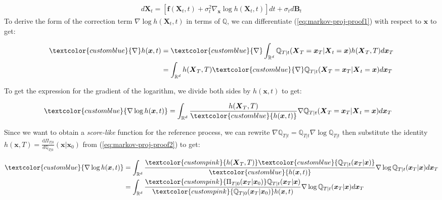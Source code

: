 \documentclass{article}
\newcommand{\bluetext}[1]{\textcolor{customblue}{#1}}
\newcommand{\pinktext}[1]{\textcolor{custompink}{#1}}
\begin{document}
\begin{align}
    d\boldsymbol{X}_t=\left[\boldsymbol{f}(\boldsymbol{X}_t,t)+\sigma_t^2\nabla _{\boldsymbol{x}}\log h(\boldsymbol{X}_t,t)\right]dt +\sigma_td\boldsymbol{B}_t\label{eq:markov-eq-4}
\end{align}
To derive the form of the correction term $\nabla \log h(\boldsymbol{X}_t,t)$ in terms of $\mathbb{Q}$, we can differentiate (\ref{eq:markov-proj-proof1}) with respect to $\boldsymbol{x}$ to get:
\begin{small}
\begin{align}
    \bluetext{\nabla }h(\boldsymbol{x},t)&=\bluetext{\nabla }\int_{\mathbb{R}^d}\mathbb{Q}_{T|t}(\boldsymbol{X}_T=\boldsymbol{x}_T|\boldsymbol{X}_t=\boldsymbol{x})h(\boldsymbol{X}_T,T)d\boldsymbol{x}_T\nonumber\\
    &=\int_{\mathbb{R}^d}h(\boldsymbol{X}_T,T)\bluetext{\nabla }\mathbb{Q}_{T|t}(\boldsymbol{X}_T=\boldsymbol{x}_T|\boldsymbol{X}_t=\boldsymbol{x})d\boldsymbol{x}_T
\end{align}
\end{small}
To get the expression for the gradient of the logarithm, we divide both sides by $h(\boldsymbol{x},t)$ to get:
\begin{small}
\begin{align}
    \bluetext{\nabla \log h(\boldsymbol{x},t)}&=\int_{\mathbb{R}^d}\frac{h(\boldsymbol{X}_T,T)}{\bluetext{h(\boldsymbol{x},t)}}\nabla \mathbb{Q}_{T|t}(\boldsymbol{X}_T=\boldsymbol{x}_T|\boldsymbol{X}_t=\boldsymbol{x})d\boldsymbol{x}_T
\end{align}
\end{small}
Since we want to obtain a \textit{score-like} function for the reference process, we can rewrite $\nabla \mathbb{Q}_{T|t}=\mathbb{Q}_{T|t}\nabla \log \mathbb{Q}_{T|t}$ then substitute the identity $h(\boldsymbol{x},T)=\frac{\mathrm{d} \Pi_{T|0}}{d \mathbb{Q}_{T|0}}(\boldsymbol{x}|\boldsymbol{x}_0)$ from (\ref{eq:markov-proj-proof2}) to get:
\begin{small}
\begin{align}
    \bluetext{\nabla \log h(\boldsymbol{x},t)}&=\int_{\mathbb{R}^d}\frac{\pinktext{h(\boldsymbol{X}_T,T)}\bluetext{\mathbb{Q}_{T|t}(\boldsymbol{x}_T|\boldsymbol{x})}}{\bluetext{h(\boldsymbol{x},t)}}\nabla \log\mathbb{Q}_{T|t}(\boldsymbol{x}_T|\boldsymbol{x})d\boldsymbol{x}_T\nonumber\\
    &=\int_{\mathbb{R}^d}\frac{\pinktext{\Pi_{T|0}(\boldsymbol{x}_T|\boldsymbol{x}_0)}\mathbb{Q}_{T|t}(\boldsymbol{x}_T|\boldsymbol{x})}{\pinktext{\mathbb{Q}_{T|0}(\boldsymbol{x}_T|\boldsymbol{x}_0)}h(\boldsymbol{x},t)}\nabla \log\mathbb{Q}_{T|t}(\boldsymbol{x}_T|\boldsymbol{x})d\boldsymbol{x}_T\label{eq:markov-eq-1}
\end{align}
\end{small}
\end{document}

